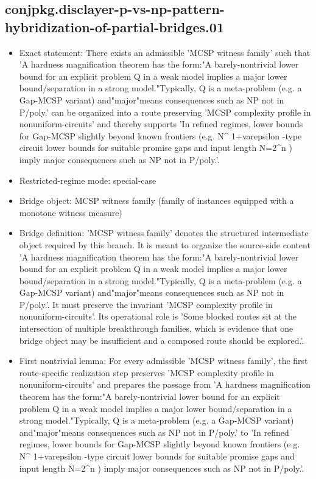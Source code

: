 \documentclass[11pt]{article}
\begin{document}
\subsection*{conjpkg.disclayer-p-vs-np-pattern-hybridization-of-partial-bridges.01}
\begin{itemize}
\item Exact statement: There exists an admissible 'MCSP witness family' such that 'A hardness magnification theorem has the form:"A barely-nontrivial lower bound for an explicit problem Q in a weak model implies a major lower bound/separation in a strong model."Typically, Q is a meta-problem (e.g. a Gap-MCSP variant) and"major"means consequences such as NP not in P/poly.' can be organized into a route preserving 'MCSP complexity profile in nonuniform-circuits' and thereby supports 'In refined regimes, lower bounds for Gap-MCSP slightly beyond known frontiers (e.g. N\textasciicircum{} 1+varepsilon -type circuit lower bounds for suitable promise gaps and input length N=2\textasciicircum{}n ) imply major consequences such as NP not in P/poly.'.
\item Restricted-regime mode: special-case
\item Bridge object: MCSP witness family (family of instances equipped with a monotone witness measure)
\item Bridge definition: 'MCSP witness family' denotes the structured intermediate object required by this branch. It is meant to organize the source-side content 'A hardness magnification theorem has the form:"A barely-nontrivial lower bound for an explicit problem Q in a weak model implies a major lower bound/separation in a strong model."Typically, Q is a meta-problem (e.g. a Gap-MCSP variant) and"major"means consequences such as NP not in P/poly.'. It must preserve the invariant 'MCSP complexity profile in nonuniform-circuits'. Its operational role is 'Some blocked routes sit at the intersection of multiple breakthrough families, which is evidence that one bridge object may be insufficient and a composed route should be explored.'.
\item First nontrivial lemma: For every admissible 'MCSP witness family', the first route-specific realization step preserves 'MCSP complexity profile in nonuniform-circuits' and prepares the passage from 'A hardness magnification theorem has the form:"A barely-nontrivial lower bound for an explicit problem Q in a weak model implies a major lower bound/separation in a strong model."Typically, Q is a meta-problem (e.g. a Gap-MCSP variant) and"major"means consequences such as NP not in P/poly.' to 'In refined regimes, lower bounds for Gap-MCSP slightly beyond known frontiers (e.g. N\textasciicircum{} 1+varepsilon -type circuit lower bounds for suitable promise gaps and input length N=2\textasciicircum{}n ) imply major consequences such as NP not in P/poly.'.

\end{itemize}
\end{document}

